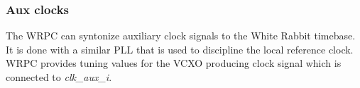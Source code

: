 \subsubsection{Aux clocks}

The WRPC can syntonize auxiliary clock signals to the White Rabbit timebase. It is done with a
similar PLL that is used to discipline the local reference clock. WRPC provides tuning values for
the VCXO producing clock signal which is connected to \emph{clk\_aux\_i}.

